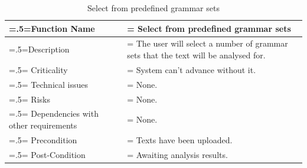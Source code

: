 \documentclass[12pt]{article}
\begin{document}
\begin{center}
    \begin{table}[H]
        \caption{Select from predefined grammar sets}
        \begin{tabularx}{\textwidth} {
                | >{\raggedright\arraybackslash\hsize=.5\hsize\linewidth=\hsize}X
                | >{\raggedright\arraybackslash\hsize=1.5\hsize\linewidth=\hsize}X |}
            \hline
            Function Name                        & Select from predefined grammar sets                                               \\ \hline
            Description                          & The user will select a number of grammar sets that the text will be analysed for. \\ \hline
            Criticality                          & System can't advance without it.                                                  \\ \hline
            Technical issues                     & None.                                                                             \\ \hline
            Risks                                & None.                                                                             \\ \hline
            Dependencies with other requirements & None.                                                                             \\ \hline
            Precondition                         & Texts have been uploaded.                                                         \\ \hline
            Post-Condition                       & Awaiting analysis results.                                                        \\ \hline
        \end{tabularx}
    \end{table}
\end{center}
\end{document}
